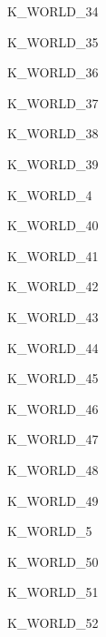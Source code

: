 \begin{datadesc}{K_WORLD_34}
\end{datadesc}
\begin{datadesc}{K_WORLD_35}
\end{datadesc}
\begin{datadesc}{K_WORLD_36}
\end{datadesc}
\begin{datadesc}{K_WORLD_37}
\end{datadesc}
\begin{datadesc}{K_WORLD_38}
\end{datadesc}
\begin{datadesc}{K_WORLD_39}
\end{datadesc}
\begin{datadesc}{K_WORLD_4}
\end{datadesc}
\begin{datadesc}{K_WORLD_40}
\end{datadesc}
\begin{datadesc}{K_WORLD_41}
\end{datadesc}
\begin{datadesc}{K_WORLD_42}
\end{datadesc}
\begin{datadesc}{K_WORLD_43}
\end{datadesc}
\begin{datadesc}{K_WORLD_44}
\end{datadesc}
\begin{datadesc}{K_WORLD_45}
\end{datadesc}
\begin{datadesc}{K_WORLD_46}
\end{datadesc}
\begin{datadesc}{K_WORLD_47}
\end{datadesc}
\begin{datadesc}{K_WORLD_48}
\end{datadesc}
\begin{datadesc}{K_WORLD_49}
\end{datadesc}
\begin{datadesc}{K_WORLD_5}
\end{datadesc}
\begin{datadesc}{K_WORLD_50}
\end{datadesc}
\begin{datadesc}{K_WORLD_51}
\end{datadesc}
\begin{datadesc}{K_WORLD_52}
\end{datadesc}
